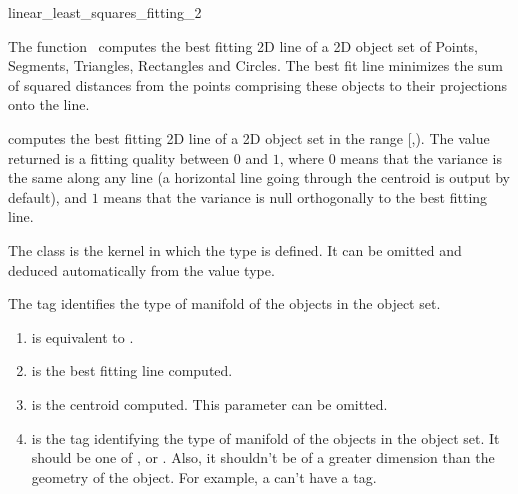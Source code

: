
\begin{ccRefFunction}{linear_least_squares_fitting_2}  

\ccDefinition
  
The function \ccRefName\ computes the best fitting 2D line of a 2D
object set of Points, Segments, Triangles, Rectangles and Circles. The best fit line minimizes the sum of squared distances
from the points comprising these objects to their projections onto the line.


{ computes the best fitting 2D line of a 2D object set in the range
[,). The value returned is a fitting quality
between $0$ and $1$, where $0$ means that the variance is the same
along any line (a horizontal line going through the centroid is output
by default), and $1$ means that the variance is null orthogonally
to the best fitting line.
 }


The class  is the kernel in which the type
 is defined. It can be omitted and
deduced automatically from the value type.

The tag  identifies the type of manifold of the objects in the object set.


\begin{enumerate}
   \item  {} is equivalent to .
   \item  {} is the best fitting line computed.
   \item  {} is the centroid computed. This parameter can be
          omitted.
   \item  {} is the tag identifying the type of manifold of the objects in the object set. It should be one of ,  or . Also, it shouldn't be of a greater dimension than the geometry of the object. For example, a  can't have a  tag.
\end{enumerate}

\end{ccRefFunction}
